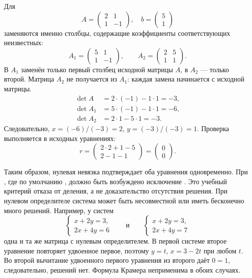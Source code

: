 \documentclass[12pt,a4paper]{article}
\begin{document}
Для
\[
A=\begin{pmatrix}2&1\\1&-1\end{pmatrix},\quad
b=\begin{pmatrix}5\\1\end{pmatrix}
\]
заменяются именно столбцы, содержащие коэффициенты соответствующих неизвестных:
\[
A_1=\begin{pmatrix}5&1\\1&-1\end{pmatrix},\qquad
A_2=\begin{pmatrix}2&5\\1&1\end{pmatrix}.
\]
В $A_1$ заменён только первый столбец исходной матрицы $A$, в $A_2$ --- только второй.
Матрица $A_2$ не получается из $A_1$: каждая замена начинается с исходной матрицы.
\begin{align*}
\det A&=2\cdot(-1)-1\cdot1=-3,\\
\det A_1&=5\cdot(-1)-1\cdot1=-6,\\
\det A_2&=2\cdot1-5\cdot1=-3.
\end{align*}
Следовательно, $x=(-6)/(-3)=2$, $y=(-3)/(-3)=1$.
Проверка выполняется в исходных уравнениях:
\[
r=\begin{pmatrix}2\cdot2+1-5\\2-1-1\end{pmatrix}
=\begin{pmatrix}0\\0\end{pmatrix}.
\]

\newpage

Таким образом, нулевая невязка подтверждает оба уравнения одновременно.
При , где по умолчанию ,
должно быть возбуждено исключение . Это учебный критерий отказа от деления,
а не доказательство отсутствия решения. При нулевом определителе система
может быть несовместной или иметь бесконечно много решений.
Например, у систем
\[
\begin{cases}x+2y=3,\\2x+4y=6\end{cases}
\qquad\text{и}\qquad
\begin{cases}x+2y=3,\\2x+4y=7\end{cases}
\]
одна и та же матрица с нулевым определителем. В первой системе второе
уравнение повторяет удвоенное первое, поэтому $y=t$, $x=3-2t$ при любом $t$.
Во второй вычитание удвоенного первого уравнения из второго даёт $0=1$,
следовательно, решений нет. Формула Крамера неприменима в обоих случаях.
\end{document}
